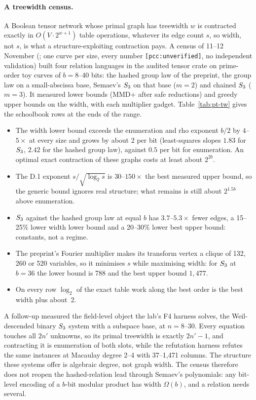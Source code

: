 \paragraph{A treewidth census.} A Boolean tensor network whose primal graph
has treewidth $w$ is contracted exactly in $O(V\cdot2^{w+1})$ table
operations, whatever its edge count $s$, so width, not $s$, is what a
structure-exploiting contraction pays. A census of 11--12 November
(; one curve per size, every
number \texttt{[pcc:unverified]}, no independent validation) built four
relation languages in the audited tensor crate on prime-order toy curves of
$b=8$--40 bits: the hashed group law of the preprint, the group law on a
small-abscissa base, Semaev's $S_{3}$ on that base ($m=2$) and chained
$S_{3}$ ($m=3$). It measured lower bounds (MMD+ after safe reductions) and
greedy upper bounds on the width, with each multiplier gadget.
Table~\ref{tab:pt-tw} gives the schoolbook rows at the ends of the range.
\begin{itemize}
\item The width lower bound exceeds the enumeration and rho exponent $b/2$
  by $4$--$5\times$ at every size and grows by about 2 per bit (least-squares
  slopes $1.83$ for $S_{3}$, $2.42$ for the hashed group law), against $0.5$
  per bit for enumeration. An optimal exact contraction of these graphs costs
  at least about $2^{2b}$.
\item The D.1 exponent $s/\sqrt{\log_2s}$ is $30$--$150\times$ the best
  measured upper bound, so the generic bound ignores real structure; what
  remains is still about $2^{1.5b}$ above enumeration.
\item $S_{3}$ against the hashed group law at equal $b$ has $3.7$--$5.3\times$
  fewer edges, a 15--25\% lower width lower bound and a 20--30\% lower best
  upper bound: constants, not a regime.
\item The preprint's Fourier multiplier makes its transform vertex a clique
  of 132, 260 or 520 variables, so it minimises $s$ while maximising width:
  for $S_{3}$ at $b=36$ the lower bound is 788 and the best upper bound
  $1{,}477$.
\item On every row $\log_2$ of the exact table work along the best order is
  the best width plus about~2.
\end{itemize}
A follow-up measured the field-level object the lab's F4 harness solves, the
Weil-descended binary $S_{3}$ system with a subspace base, at $n=8$--30.
Every equation touches all $2n'$ unknowns, so its primal treewidth is
exactly $2n'-1$, and contracting it is enumeration of both slots, while the
refutation harness refutes the same instances at Macaulay degree 2--4 with
37--1{,}471 columns. The structure these systems offer is algebraic degree,
not graph width. The census therefore does not reopen the hashed-relation
lead through Semaev's polynomials: any bit-level encoding of a $b$-bit
modular product has width $\Omega(b)$, and a relation needs several.

